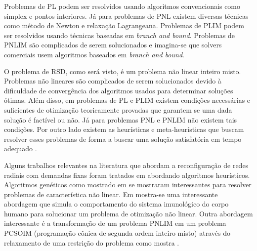 
Problemas de PL podem ser resolvidos usando algoritmos convencionais como simplex e pontos interiores.
Já para problemas de PNL existem diversas técnicas como método de Newton e relaxação Lagrangeana.
Problemas de PLIM podem ser resolvidos usando técnicas baseadas em \emph{branch and bound}.
Problemas de PNLIM são complicados de serem solucionados e imagina-se que solvers comerciais usem algoritmos baseados em \emph{branch and bound}. 

O problema de RSD, como será visto, é um problema não linear inteiro misto.
Problemas não lineares são complicados de serem solucionados devido à dificuldade de convergência dos algoritmos usados para determinar soluções ótimas. 
Além disso, em problemas de PL e PLIM existem condições necessárias e suficientes de otimização teoricamente provadas que garantem se uma dada solução é factível ou não.
Já para problemas PNL e PNLIM não existem tais condições. Por outro lado existem as heurísticas e meta-heurísticas que buscam resolver esses problemas de forma a buscar uma solução satisfatória em tempo adequado \cite{Goncalves2013ModelosRadiais}.  

Alguns trabalhos relevantes na literatura que abordam a reconfiguração de redes radiais com demandas fixas foram tratados em \cite{Baran1989NetworkBalancing} abordando algoritmos heurísticos.
Algoritmos genéticos como mostrado em  \cite{Souza2015AlgoritmoVariaveis} se mostraram interessantes para resolver problemas de característica não linear.
Em \cite{deCastro2002AnOptimization} mostra-se uma interessante abordagem que simula o comportamento do sistema imunológico do corpo humano para solucionar um problema de otimização não linear.
Outra abordagem interessante é a transformação de um problema PNLIM em um problema PCSOIM (programação cônica de segunda ordem inteiro misto) através do relaxamento de uma restrição do problema como mostra \cite{Romais2014ReconfiguracaoMista}.